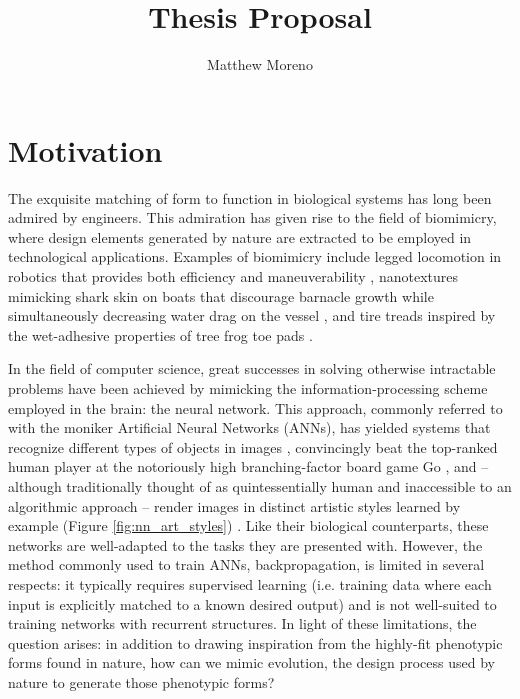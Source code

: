 \documentclass[a4paper]{article}
\title{Thesis Proposal}
\author{Matthew Moreno}
\begin{document}
\maketitle

\doublespacing

\section{Motivation} \label{sec:motivation}
The exquisite matching of form to function in biological systems has long been admired by engineers. This admiration has given rise to the field of biomimicry, where design elements generated by nature are extracted to be employed in technological applications. Examples of biomimicry include legged locomotion in robotics that provides both efficiency and maneuverability \cite{Grimes2012THE}, nanotextures mimicking shark skin on boats that discourage barnacle growth while simultaneously decreasing water drag on the vessel \cite{Stenzel2011Drag-reducingShipping}, and tire treads inspired by the wet-adhesive properties of tree frog toe pads \cite{Persson2007WetTires}.

In the field of computer science, great successes in solving otherwise intractable problems have been achieved by mimicking the information-processing scheme employed in the brain: the neural network. This approach, commonly referred to with the moniker Artificial Neural Networks (ANNs), has yielded systems that recognize different types of objects in images \cite{KrizhevskyImageNetNetworks}, convincingly beat the top-ranked human player at the notoriously high branching-factor board game Go \cite{Silver2016MasteringSearch}, and -- although traditionally thought of as quintessentially human and inaccessible to an algorithmic approach -- render images in distinct artistic styles learned by example (Figure \ref{fig:nn_art_styles}) \cite{Gatys2015AStyle}. Like their biological counterparts, these networks are well-adapted to the tasks they are presented with. However, the method commonly used to train ANNs, backpropagation, is limited in several respects: it typically requires supervised learning (i.e. training data where each input is explicitly matched to a known desired output) and is not well-suited to training networks with recurrent structures. In light of these limitations, the question arises: in addition to drawing inspiration from the highly-fit phenotypic forms found in nature, how can we mimic evolution, the design process used by nature to generate those phenotypic forms?
\end{document}
